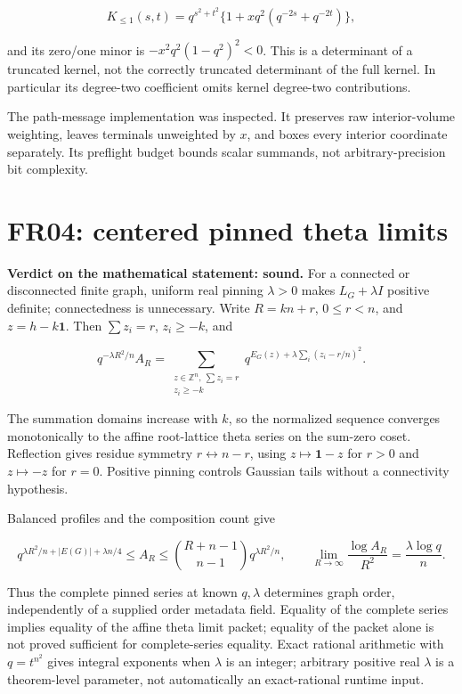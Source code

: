 \documentclass[
  11pt,
  a4paper,
]{report}
\begin{document}
\[
 K_{\le1}(s,t)=q^{s^2+t^2}\{1+xq^2(q^{-2s}+q^{-2t})\},
\]

and its zero/one minor is \(-x^2q^2(1-q^2)^2<0\). This is a determinant
of a truncated kernel, not the correctly truncated determinant of the
full kernel. In particular its degree-two coefficient omits kernel
degree-two contributions.

The path-message implementation was inspected. It preserves raw
interior-volume weighting, leaves terminals unweighted by \(x\), and
boxes every interior coordinate separately. Its preflight budget bounds
scalar summands, not arbitrary-precision bit complexity.

\hypertarget{fr04-centered-pinned-theta-limits}{%
\section{FR04: centered pinned theta
limits}\label{fr04-centered-pinned-theta-limits}}

\textbf{Verdict on the mathematical statement: sound.} For a connected
or disconnected finite graph, uniform real pinning \(\lambda>0\) makes
\(L_G+\lambda I\) positive definite; connectedness is unnecessary. Write
\(R=kn+r\), \(0\le r<n\), and \(z=h-k\mathbf1\). Then \(\sum z_i=r\),
\(z_i\ge-k\), and

\[
 q^{-\lambda R^2/n}A_R
 =\sum_{\substack{z\in\mathbb Z^n,\ \sum z_i=r\\z_i\ge-k}}
 q^{E_G(z)+\lambda\sum_i(z_i-r/n)^2}.
\]

The summation domains increase with \(k\), so the normalized sequence
converges monotonically to the affine root-lattice theta series on the
sum-zero coset. Reflection gives residue symmetry
\(r\leftrightarrow n-r\), using \(z\mapsto\mathbf1-z\) for \(r>0\) and
\(z\mapsto-z\) for \(r=0\). Positive pinning controls Gaussian tails
without a connectivity hypothesis.

Balanced profiles and the composition count give

\[
 q^{\lambda R^2/n+|E(G)|+\lambda n/4}
 \le A_R\le {R+n-1\choose n-1}q^{\lambda R^2/n},
 \qquad
 \lim_{R\to\infty}\frac{\log A_R}{R^2}=\frac{\lambda\log q}{n}.
\]

Thus the complete pinned series at known \(q,\lambda\) determines graph
order, independently of a supplied order metadata field. Equality of the
complete series implies equality of the affine theta limit packet;
equality of the packet alone is not proved sufficient for
complete-series equality. Exact rational arithmetic with \(q=t^{n^2}\)
gives integral exponents when \(\lambda\) is an integer; arbitrary
positive real \(\lambda\) is a theorem-level parameter, not
automatically an exact-rational runtime input.
\end{document}

